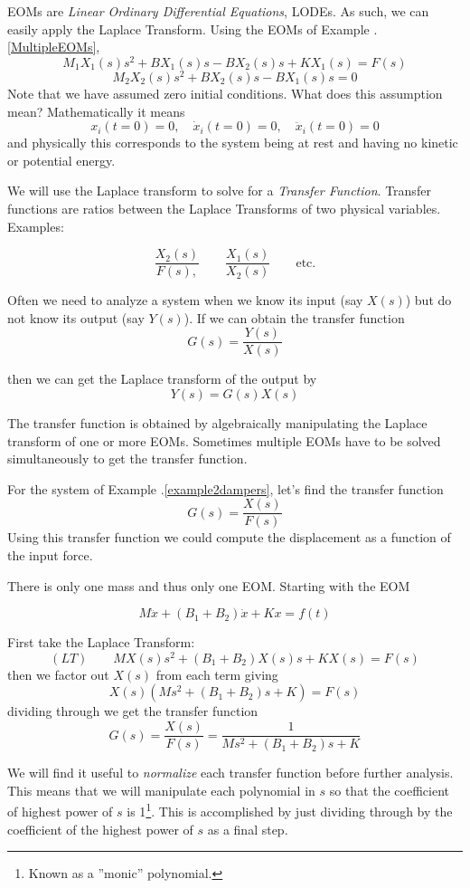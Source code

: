EOMs are {\it Linear Ordinary Differential Equations}, LODEs.  As such, we can easily apply the Laplace Transform.
Using the EOMs of Example \thechapter.\ref{MultipleEOMs},
\[
M_1X_1(s)s^2 + BX_1(s)s - BX_2(s)s + KX_1(s) = F(s)
\]
\[
M_2X_2(s)s^2 + BX_2(s)s - BX_1(s)s = 0
\]
Note that we have assumed zero initial conditions.   What does this assumption mean?  Mathematically it means
\[
x_i(t=0) = 0, \quad \dot{x}_i(t=0) = 0, \quad \ddot{x}_i(t=0) = 0
\]
and physically this corresponds to the system being at rest and having no kinetic or potential energy.

We will use the Laplace transform to solve for a {\it Transfer Function}.   Transfer functions are ratios between the Laplace Transforms of two physical variables.  Examples:

\[
\frac{X_2(s)}{F(s),} \qquad
\frac{X_1(s)}{X_2(s)} \qquad \mathrm{etc.}
\]

Often we need to analyze a system when we know its input (say $X(s)$) but do not know its output (say $Y(s)$).  If we can obtain the transfer function
\[
G(s) = \frac{Y(s)}{X(s)}
\]

then we can get the Laplace transform of the output by
\[
Y(s) = G(s)X(s)
\]

The transfer function is obtained by algebraically manipulating the Laplace transform of one or more EOMs.
Sometimes multiple EOMs have to be solved simultaneously to get the transfer function.

\begin{ExampleSmall}\label{TransferFunctionExample}
For the system of Example \thechapter.\ref{example2dampers}, let's find the transfer function
\[
G(s) = \frac {X(s)}{F(s)}
\]
Using this transfer function we could compute the displacement as a function of the input force.


There is only one mass and thus only one EOM.  Starting with the EOM

\[
M\ddot{x} + (B_1+B_2)\dot{x}+Kx = f(t)
\]

First take the Laplace Transform:
\[
(LT) \qquad   MX(s)s^2 + (B_1+B_2)X(s)s + KX(s) = F(s)
\]
then we factor out $X(s)$ from each term giving
\[
X(s)\left( Ms^2 +(B_1+B_2)s + K \right) = F(s)
\]
dividing through we get the transfer function
\[
G(s) = \frac {X(s)}{F(s)} = \frac {1}{Ms^2 + (B_1+B_2)s + K }
\]

\end{ExampleSmall}


We will find it useful to {\it normalize} each transfer function before further analysis.   This means that we will manipulate each polynomial in $s$ so that the coefficient of  highest power of $s$ is 1\footnote{Known as a ''monic'' polynomial.}.    This is accomplished by just dividing through by the coefficient of the highest power of $s$ as a final step.


